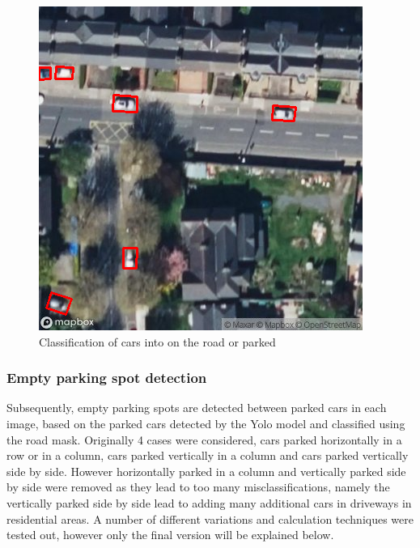 \begin{figure}[htbp]
\begin{minipage}{0.45\textwidth}
    \end{minipage}
    \hfill
    \begin{minipage}{0.45\textwidth}
        \centering
        \includegraphics[width=\textwidth]{images/road_mask_classification3.png}
    \end{minipage}
    \caption{Classification of cars into on the road or parked}
    \label{fig:Road_mask_classification}
\end{figure}

\newpage

\subsubsection{Empty parking spot detection}
Subsequently, empty parking spots are detected between parked cars in each image, based on the parked cars detected by the Yolo model and classified using the road mask.
Originally 4 cases were considered, cars parked horizontally in a row or in a column, cars parked vertically in a column and cars parked vertically side by side. However horizontally parked in a column and vertically parked side by side were removed as they lead to too many misclassifications, namely the vertically parked side by side lead to adding many additional cars in driveways in residential areas.
A number of different variations and calculation techniques were tested out, however only the final version will be explained below.

